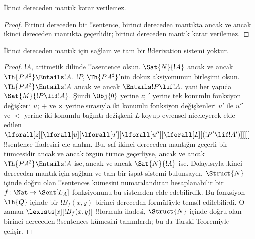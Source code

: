 




\begin{thm}
İkinci dereceden mantık karar verilemez.
\end{thm}

\begin{proof}
Birinci dereceden bir !!{sentence}, birinci dereceden mantıkta ancak ve ancak
ikinci dereceden mantıkta geçerlidir; birinci dereceden mantık karar
verilemez.
\end{proof}

\begin{thm}
İkinci dereceden mantık için sağlam ve tam bir !!{derivation} sistemi yoktur.
\end{thm}

\begin{proof}
$!A$, aritmetik dilinde !!a{sentence} olsun. $\Sat{N}{!A}$ ancak ve ancak
$\Th{PA^2}\Entails !A$. $!P$, $\Th{PA^2}$'nin dokuz aksiyomunun birleşimi
olsun. $\Th{PA^2}\Entails !A$ ancak ve ancak $\Entails !P\lif !A$, yani
her yapıda $\Sat{M}{!P\lif !A}$. Şimdi $\Obj{0}$ yerine $z$; $\prime$ yerine tek
konumlu fonksiyon değişkeni $u$; $+$ ve $\times$ yerine sırasıyla iki
konumlu fonksiyon değişkenleri $u'$ ile $u''$ ve $<$ yerine iki konumlu
bağıntı değişkeni $L$ koyup evrensel niceleyerek elde edilen
$\lforall[z][\lforall[u][\lforall[u'][\lforall[u''][\lforall[L][(!P' \lif !A')]]]]]$
!!{sentence} ifadesini ele alalım. Bu, saf ikinci dereceden mantığın geçerli bir
tümcesidir ancak ve ancak özgün tümce geçerliyse, ancak ve ancak
$\Th{PA^2}\Entails !A$ ise, ancak ve ancak $\Sat{N}{!A}$ ise. Dolayısıyla
ikinci dereceden mantık için sağlam ve tam bir ispat sistemi bulunsaydı,
$\Struct{N}$ içinde doğru olan !!{sentence}s kümesini numaralandıran
hesaplanabilir bir $f\colon\Nat\to\Sent[L_A]$ fonksiyonunu bu sistemden elde
edebilirdik. Bu fonksiyon $\Th{Q}$ içinde bir $!B_f(x,y)$ birinci dereceden
formülüyle temsil edilebilirdi. O zaman $\lexists[x][!B_f(x,y)]$
!!{formula} ifadesi, $\Struct{N}$ içinde doğru olan birinci dereceden
!!{sentence}s kümesini tanımlardı; bu da Tarski Teoremiyle çelişir.
\end{proof}



